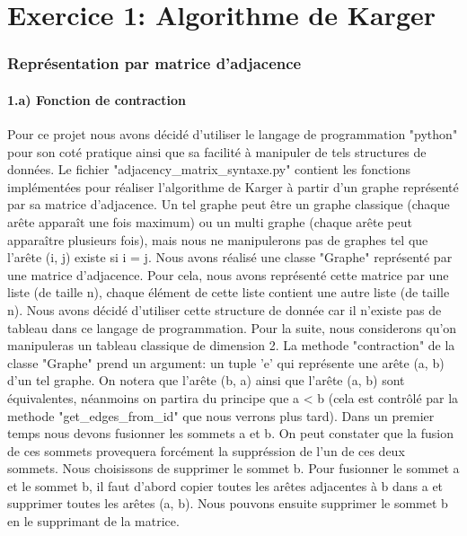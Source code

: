 \part{Exercice 1: Algorithme de Karger}

\section{Représentation par matrice d'adjacence}

\subsection{1.a) Fonction de contraction}

Pour ce projet nous avons décidé d'utiliser le langage de programmation "python" pour son coté pratique ainsi que sa facilité à manipuler de tels structures de données. Le fichier "adjacency\_matrix\_syntaxe.py" contient les fonctions implémentées pour réaliser l'algorithme de Karger à partir d'un graphe représenté par sa matrice d'adjacence. Un tel graphe peut être un graphe classique (chaque arête apparaît une fois maximum) ou un multi graphe (chaque arête peut apparaître plusieurs fois), mais nous ne manipulerons pas de graphes tel que l'arête (i, j) existe si i = j. 
\newline \newline
Nous avons réalisé une classe "Graphe" représenté par une matrice d'adjacence. Pour cela, nous avons représenté cette matrice par une liste (de taille n), chaque élément de cette liste contient une autre liste (de taille n). Nous avons décidé d'utiliser cette structure de donnée car il n'existe pas de tableau dans ce langage de programmation. Pour la suite, nous considerons qu'on manipuleras un tableau classique de dimension 2. \newline
La methode "contraction" de la classe "Graphe" prend un argument: un tuple 'e' qui représente une arête (a, b) d'un tel graphe. On notera que l'arête (b, a) ainsi que l'arête (a, b) sont équivalentes, néanmoins on partira du principe que a < b (cela est contrôlé par la methode "get\_edges\_from\_id" que nous verrons plus tard). Dans un premier temps nous devons fusionner les sommets a et b. On peut constater que la fusion de ces sommets provequera forcément la suppréssion de l'un de ces deux sommets. Nous choisissons de supprimer le sommet b. \newline
Pour fusionner le sommet a et le sommet b, il faut d'abord copier toutes les arêtes adjacentes à b dans a et supprimer toutes les arêtes (a, b). Nous pouvons ensuite supprimer le sommet b en le supprimant de la matrice. \newline \newline 

